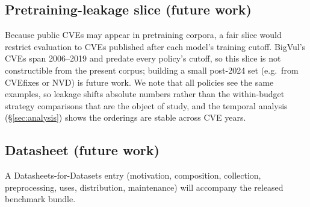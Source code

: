 \subsection{Pretraining-leakage slice (future work)}
Because public CVEs may appear in pretraining corpora, a fair slice would
restrict evaluation to CVEs published after each model's training cutoff.
BigVul's CVEs span 2006--2019 and predate every policy's cutoff, so this slice
is not constructible from the present corpus; building a small post-2024 set
(e.g.\ from CVEfixes or NVD) is future work. We note that all policies see the
same examples, so leakage shifts absolute numbers rather than the
within-budget strategy comparisons that are the object of study, and the
temporal analysis (\S\ref{sec:analysis}) shows the orderings are stable across
CVE years.

\subsection{Datasheet (future work)}
A Datasheets-for-Datasets \citep{gebru2021datasheets} entry (motivation,
composition, collection, preprocessing, uses, distribution, maintenance) will
accompany the released benchmark bundle.
